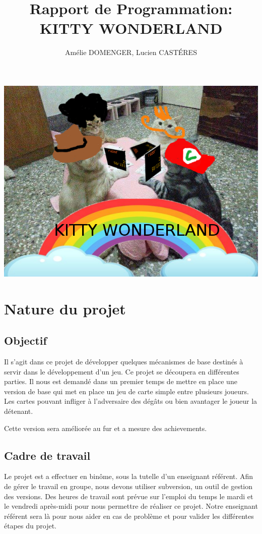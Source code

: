 \documentclass[10pt,a4paper]{article}
\title{Rapport de Programmation: KITTY WONDERLAND}
\author{Amélie DOMENGER, Lucien CASTÉRES}
\begin{document}
\maketitle
\includegraphics[width=\textwidth]{chats3.jpg}
\newpage
\tableofcontents

\newpage

\section{Nature du projet}
\subsection{Objectif}
Il s’agit dans ce projet de développer quelques mécanismes de base destinés à servir dans le développement d’un jeu.
Ce projet se découpera en différentes parties. Il nous est demandé dans un premier temps de mettre en place une version de base qui met en place un jeu de carte simple entre plusieurs joueurs. 
Les cartes pouvant infliger à l'adversaire des dégâts ou bien avantager le joueur la détenant.

Cette version sera améliorée au fur et a mesure des achievements.

\subsection{Cadre de travail}
Le projet est a effectuer en binôme, sous la tutelle d'un enseignant référent. Afin de gérer le travail en groupe, nous devons utiliser subversion, un outil de gestion des versions. Des heures de travail sont prévue sur l'emploi du temps le mardi et le vendredi après-midi pour nous permettre de réaliser ce projet. Notre enseignant référent sera là pour nous aider en cas de problème et pour valider les différentes étapes du projet.
\end{document}
